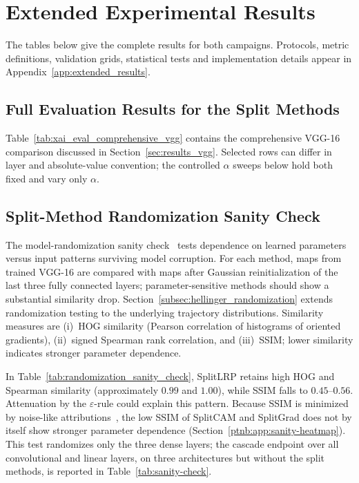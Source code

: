 \chapter{Extended Experimental Results}\label{app:supp_experiments}

The tables below give the complete results for both campaigns. Protocols, metric definitions, validation grids, statistical tests and implementation details appear in Appendix~\ref{app:extended_results}.

\section{Full Evaluation Results for the Split Methods}\label{app:saliency}

Table~\ref{tab:xai_eval_comprehensive_vgg} contains the comprehensive VGG-16 comparison discussed in Section~\ref{sec:results_vgg}. Selected rows can differ in layer and absolute-value convention; the controlled $\alpha$ sweeps below hold both fixed and vary only $\alpha$.



\section{Split-Method Randomization Sanity Check}\label{app:p1_sanity}

The model-randomization sanity check~\parencite{Adebayo2018sanity} tests dependence on learned parameters versus input patterns surviving model corruption. For each method, maps from trained VGG-16 are compared with maps after Gaussian reinitialization of the last three fully connected layers; parameter-sensitive methods should show a substantial similarity drop. Section~\ref{subsec:hellinger_randomization} extends randomization testing to the underlying trajectory distributions. Similarity measures are (i)~HOG similarity (Pearson correlation of histograms of oriented gradients), (ii)~signed Spearman rank correlation, and (iii)~SSIM; lower similarity indicates stronger parameter dependence.



In Table~\ref{tab:randomization_sanity_check}, SplitLRP retains high HOG and Spearman similarity (approximately $0.99$ and $1.00$), while SSIM falls to $0.45$--$0.56$. Attenuation by the $\varepsilon$-rule could explain this pattern. Because SSIM is minimized by noise-like attributions~\parencite{Binder2022shortcomings}, the low SSIM of SplitCAM and SplitGrad does not by itself show stronger parameter dependence (Section~\ref{ptnb:app:sanity-heatmap}). This test randomizes only the three dense layers; the cascade endpoint over all convolutional and linear layers, on three architectures but without the split methods, is reported in Table~\ref{tab:sanity-check}.


